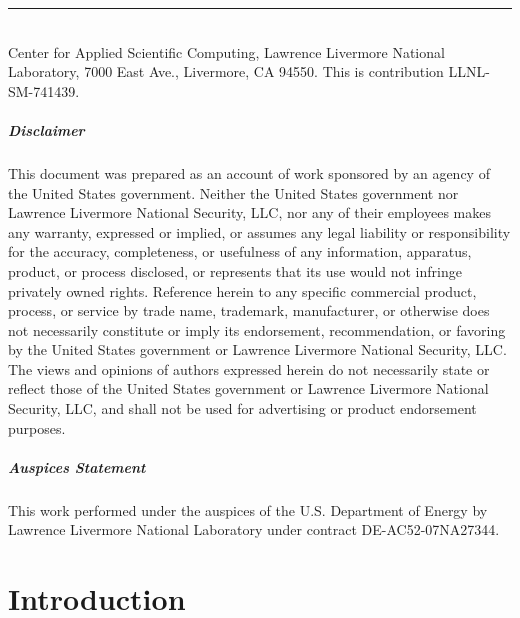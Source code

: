 \documentclass[11pt]{report}
\begin{document}
{%

\null
\color{dark_grey} \hspace{-6mm}\rule{\textwidth}{2pt}\\ 
{\small
  \fontfamily{\sfdefault}\selectfont Center for Applied Scientific
  Computing, Lawrence Livermore National Laboratory, 7000 East Ave., Livermore, CA 94550. This is
  contribution LLNL-SM-741439.
}  
}



\pagebreak
{}
\paragraph {Disclaimer} 
This document was prepared as an account of work sponsored by an agency of the United States
government. Neither the United States government nor Lawrence Livermore National Security, LLC, nor
any of their employees makes any warranty, expressed or implied, or assumes any legal liability or
responsibility for the accuracy, completeness, or usefulness of any information, apparatus, product,
or process disclosed, or represents that its use would not infringe privately owned
rights. Reference herein to any specific commercial product, process, or service by trade name,
trademark, manufacturer, or otherwise does not necessarily constitute or imply its endorsement,
recommendation, or favoring by the United States government or Lawrence Livermore National Security,
LLC. The views and opinions of authors expressed herein do not necessarily state or reflect those of
the United States government or Lawrence Livermore National Security, LLC, and shall not be used for
advertising or product endorsement purposes. 

\paragraph{Auspices Statement}
This work performed under the auspices of the U.S. Department of Energy by Lawrence Livermore
National Laboratory under contract DE-AC52-07NA27344.
\tableofcontents


\chapter{Introduction}
\end{document}
